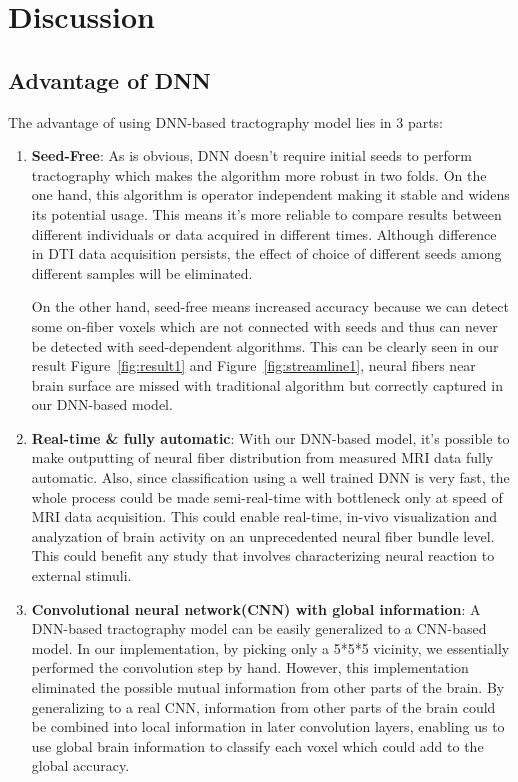 \documentclass[10pt,twocolumn,letterpaper]{article}
\begin{document}
	\section{Discussion}
	
	\subsection{Advantage of DNN}
	The advantage of using DNN-based tractography model lies in 3 parts:
	\begin{enumerate}
		\item 
		\textbf{Seed-Free}:
		As is obvious, DNN doesn’t require initial seeds to perform tractography which makes the algorithm more robust in two folds. On the one hand, this algorithm is operator independent making it stable and widens its potential usage. This means it's more reliable to compare results between different individuals or data acquired in different times. Although difference in DTI data acquisition persists, the effect of choice of different seeds among different samples will be eliminated.
		
		On the other hand, seed-free means increased accuracy because we can detect some on-fiber voxels which are not connected with seeds and thus can never be detected with seed-dependent algorithms. This can be clearly seen in our result Figure~\ref{fig:result1} and Figure~\ref{fig:streamline1}, neural fibers near brain surface are missed with traditional algorithm but correctly captured in our DNN-based model.
		
		\item
		\textbf{Real-time \& fully automatic}:
		With our DNN-based model, it’s possible to make outputting of neural fiber distribution from measured MRI data fully automatic. Also, since classification using a well trained DNN is very fast, the whole process could be made semi-real-time with bottleneck only at speed of MRI data acquisition. This could enable real-time, in-vivo visualization and analyzation of brain activity on an unprecedented neural fiber bundle level. This could benefit any study that involves characterizing neural reaction to external stimuli.
		
		
		\item
		\textbf{Convolutional neural network(CNN) with global information}:
		A DNN-based tractography model can be easily generalized to a CNN-based model. In our implementation, by picking only a 5*5*5 vicinity, we essentially performed the convolution step by hand. However, this implementation eliminated the possible mutual information from other parts of the brain. By generalizing to a real CNN, information from other parts of the brain could be combined into local information in later convolution layers, enabling us to use global brain information to classify each voxel which could add to the global accuracy.
		
	\end{enumerate}
	
\end{document}
